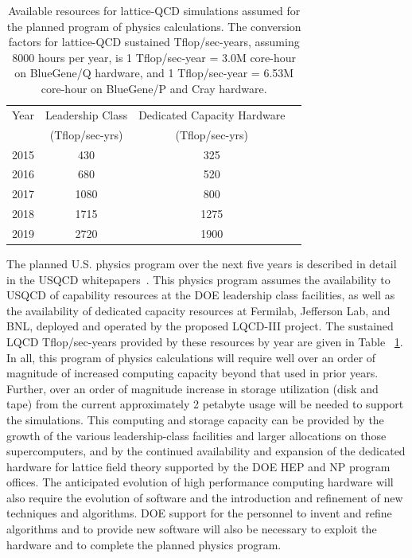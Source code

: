 \begin{table}[t]
\begin{center}
\caption{Available resources for lattice-QCD simulations assumed for the
planned program of physics calculations.  The conversion factors for
lattice-QCD sustained Tflop/sec-years, assuming 8000 hours per year, is 1
Tflop/sec-year = 3.0M core-hour on BlueGene/Q hardware, and 1 Tflop/sec-year =
6.53M core-hour on BlueGene/P and Cray hardware. \vspace{1.5mm}}
\label{tab:fiveyear}
\begin{tabular}{lccc}
\hline\hline  
Year & Leadership Class  & Dedicated Capacity Hardware  \\[-0.75mm] 
& (Tflop/sec-yrs) & (Tflop/sec-yrs) \\[0.5mm] \hline
2015 & 430 & 325 \\
2016 & 680 & 520 \\
2017 & 1080 & 800 \\
2018 & 1715 & 1275 \\ 
2019 & 2720 & 1900 \\ \hline\hline
\end{tabular}
\end{center}
\end{table}

The planned U.S. physics program over the next five years is described in
detail in the USQCD
whitepapers~\cite{USQCD_EF_whitepaper13,USQCD_IF_whitepaper13,USQCD_NP_whitepaper13,USQCD_Thermo_whitepaper13}.
This physics program assumes the availability to USQCD of capability resources
at the DOE leadership class facilities, as well as the availability of
dedicated capacity resources at Fermilab, Jefferson Lab, and BNL, deployed and
operated by the proposed LQCD-III project.  The sustained LQCD Tflop/sec-years
provided by these resources by year are given in Table ~\ref{tab:fiveyear}. In
all, this program of physics calculations will require well over an order of
magnitude of increased computing capacity beyond that used in prior years.
Further, over an order of magnitude increase in storage utilization (disk and
tape) from the current approximately 2 petabyte usage will be needed to
support the simulations.  This computing and storage capacity can be provided
by the growth of the various leadership-class facilities and larger
allocations on those supercomputers, and by the continued availability and
expansion of the dedicated hardware for lattice field theory supported by the
DOE HEP and NP program offices.  The anticipated evolution of high performance
computing hardware will also require the evolution of software and the
introduction and refinement of new techniques and algorithms.  DOE support for
the personnel to invent and refine algorithms and to provide new software will
also be necessary to exploit the hardware and to complete the planned physics
program.

